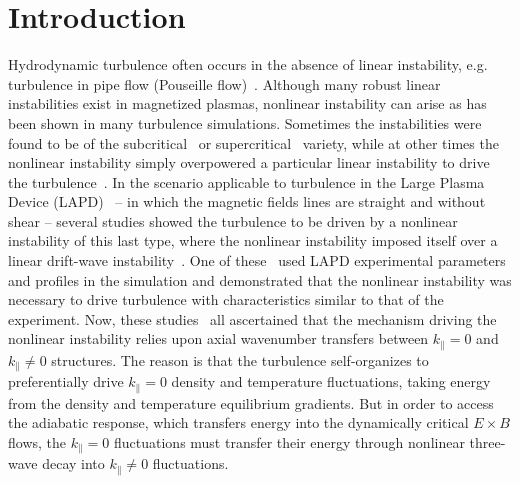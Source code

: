 \documentclass[showpacs,preprintnumbers,amsmath,amssymb,superscriptaddress,aip]{revtex4-1}
\def\para{\parallel}
\begin{document}
\section{Introduction}

Hydrodynamic turbulence often occurs in the absence of linear instability, e.g. turbulence in pipe flow (Pouseille flow)~\cite{manneville2008}.  Although many robust linear instabilities exist in magnetized plasmas, nonlinear instability can arise as has been shown in many turbulence simulations.
Sometimes the instabilities were found to be of the subcritical~\cite{waltz1985,scott1990,scott1992,nordman1993,itoh1996,highcock2012} or supercritical~\cite{dimits2000,ernst2004} variety, 
while at other times the nonlinear instability simply overpowered a particular linear instability to drive the 
turbulence~\cite{biskamp1995,drake1995,zeiler1996,zeiler1997,korsholm1999,scott2002,scott2003,scott2005,friedman2012b}. In the scenario applicable to turbulence in
the Large Plasma Device (LAPD)~\cite{Gekelman1991} -- in which the magnetic fields lines are straight and without shear -- several studies showed the turbulence to be driven by a nonlinear instability
of this last type, where the nonlinear instability imposed itself over a linear drift-wave instability~\cite{biskamp1995,drake1995,korsholm1999,friedman2012b}. 
One of these~\cite{friedman2012b} used LAPD experimental parameters and profiles in the simulation and demonstrated
that the nonlinear instability was necessary to drive turbulence with characteristics similar to that of the experiment.
Now, these studies~\cite{biskamp1995,drake1995,korsholm1999,friedman2012b} all ascertained
that the mechanism driving the nonlinear instability relies upon axial wavenumber transfers between $k_\para = 0$ and $k_\para \ne 0$ structures. The reason is that the turbulence self-organizes
to preferentially drive $k_\para = 0$ density and temperature fluctuations, taking energy from the density and temperature equilibrium gradients. But in order to access the adiabatic response,
which transfers energy into the dynamically critical $E \times B$ flows, the $k_\para = 0$ fluctuations must transfer their energy through nonlinear three-wave decay into $k_\para \ne 0$ fluctuations.
\end{document}
